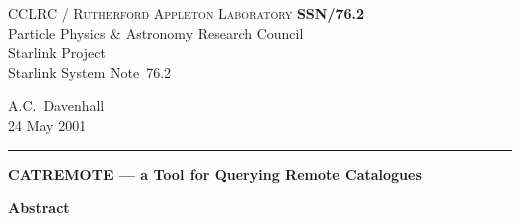 \documentclass[twoside,11pt]{article}
\newcommand{\stardoccategory}  {Starlink System Note}
\newcommand{\stardocinitials}  {SSN}
\newcommand{\stardocnumber}    {76.2}
\newcommand{\stardocauthors}   {A.C.~Davenhall}
\newcommand{\stardocdate}      {24 May 2001}
\newcommand{\stardoctitle}     {CATREMOTE --- a Tool for Querying Remote
Catalogues}
\newcommand{\stardocname}{\stardocinitials /\stardocnumber}
\newenvironment{latexonly}{}{}
\renewcommand{\_}{\texttt{\symbol{95}}}
\begin{document}
\thispagestyle{empty}

\begin{latexonly}
   CCLRC / \textsc{Rutherford Appleton Laboratory} \hfill \textbf{\stardocname}\\
   {\large Particle Physics \& Astronomy Research Council}\\
   {\large Starlink Project\\}
   {\large \stardoccategory\ \stardocnumber}
   \begin{flushright}
   \stardocauthors\\
   \stardocdate
   \end{flushright}
   \vspace{-4mm}
   \rule{\textwidth}{0.5mm}
   \vspace{5mm}
   \begin{center}
   {\Large\textbf{\stardoctitle}}
   \end{center}
   \vspace{5mm}

   \vspace{10mm}
   \begin{center}
      {\Large\textbf{Abstract}}
   \end{center}
\end{latexonly}
\end{document}
